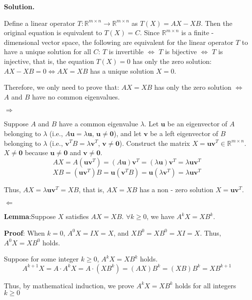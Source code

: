 \documentclass[12pt, a4paper, oneside]{ctexart}
\newenvironment{solution}{\par\noindent\textbf{Solution. }}{\par}
\begin{document}
\begin{solution}


Define a linear operator $ T: \mathbb{R}^{m \times n} \to \mathbb{R}^{m \times n} $ as $ T(X) = AX - XB $. Then the original equation is equivalent to $ T(X) = C $. Since $ \mathbb{R}^{m \times n} $ is a finite - dimensional vector space, the following are equivalent for the linear operator $ T $ to have a unique solution for all $ C $: $ T $ is invertible $ \Leftrightarrow $ $ T $ is bijective $ \Leftrightarrow $ $ T $ is injective, that is, the equation $ T(X) = 0 $ has only the zero solution:$AX - XB = 0 \Leftrightarrow AX = XB$ has a unique solution $ X = 0 $.

Therefore, we only need to prove that: $ AX = XB $ has only the zero solution $ \Leftrightarrow $ $ A $ and $ B $ have no common eigenvalues.

$\Rightarrow$

Suppose $ A $ and $ B $ have a common eigenvalue $ \lambda $. Let $ \mathbf{u} $ be an eigenvector of $ A $ belonging to $ \lambda $ (i.e., $ A\mathbf{u} = \lambda \mathbf{u} $, $ \mathbf{u} \neq \mathbf{0} $), and let $ \mathbf{v} $ be a left eigenvector of $ B $ belonging to $ \lambda $ (i.e., $ \mathbf{v}^T B = \lambda \mathbf{v}^T $, $ \mathbf{v} \neq \mathbf{0} $). Construct the matrix $ X = \mathbf{u} \mathbf{v}^T \in \mathbb{R}^{m \times n} $. $ X \neq \mathbf{0} $ because $ \mathbf{u} \neq \mathbf{0} $ and $ \mathbf{v} \neq \mathbf{0} $.
$$
AX = A(\mathbf{u} \mathbf{v}^T) = (A \mathbf{u}) \mathbf{v}^T = (\lambda \mathbf{u}) \mathbf{v}^T = \lambda \mathbf{u} \mathbf{v}^T
$$
$$
XB = (\mathbf{u} \mathbf{v}^T) B = \mathbf{u} (\mathbf{v}^T B) = \mathbf{u} (\lambda \mathbf{v}^T) = \lambda \mathbf{u} \mathbf{v}^T
$$

Thus, $ AX = \lambda \mathbf{u} \mathbf{v}^T = XB $, that is, $ AX = XB $ has a non - zero solution $ X = \mathbf{u} \mathbf{v}^T $.

$\Leftarrow$

\textbf{Lemma}:Suppose $ X $ satisfies $ A X = X B $. $ \forall k \geq 0 $, we have $ A^k X = X B^k $.  

\textbf{Proof}: When $ k = 0 $, $ A^0 X = I X = X $, and $ X B^0 = X B^0 = X I = X $. Thus, $ A^0 X = X B^0 $ holds. 

Suppose for some integer $ k \geq 0 $, $ A^k X = X B^k $ holds.  
$$
A^{k + 1} X = A \cdot A^k X = A \cdot (X B^k) = (A X) B^k = (X B) B^k = X B^{k + 1}
$$  

Thus, by mathematical induction, we prove $ A^k X = X B^k $ holds for all integers $ k \geq 0 $  


\end{solution}
\end{document}
